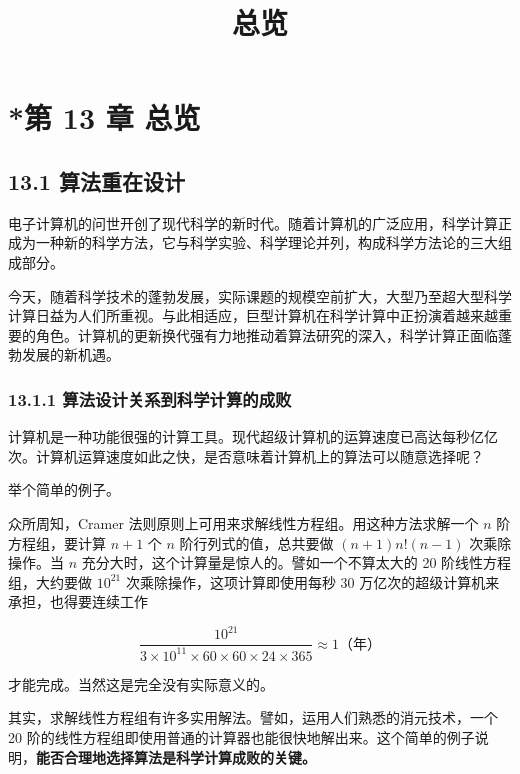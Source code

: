 \documentclass[
  10pt,
  fontset=fandol]{ctexart}
\title{总览}
\author{}
\date{}
\begin{document}
\maketitle

\section{*第 13 章 总览}\label{ux7b2c-13-ux7ae0-ux603bux89c8}

\subsection{13.1 算法重在设计}\label{ux7b97ux6cd5ux91cdux5728ux8bbeux8ba1}

电子计算机的问世开创了现代科学的新时代。随着计算机的广泛应用，科学计算正成为一种新的科学方法，它与科学实验、科学理论并列，构成科学方法论的三大组成部分。

今天，随着科学技术的蓬勃发展，实际课题的规模空前扩大，大型乃至超大型科学计算日益为人们所重视。与此相适应，巨型计算机在科学计算中正扮演着越来越重要的角色。计算机的更新换代强有力地推动着算法研究的深入，科学计算正面临蓬勃发展的新机遇。

\subsubsection{13.1.1 算法设计关系到科学计算的成败}\label{ux7b97ux6cd5ux8bbeux8ba1ux5173ux7cfbux5230ux79d1ux5b66ux8ba1ux7b97ux7684ux6210ux8d25}

计算机是一种功能很强的计算工具。现代超级计算机的运算速度已高达每秒亿亿次。计算机运算速度如此之快，是否意味着计算机上的算法可以随意选择呢？

举个简单的例子。

众所周知，Cramer 法则原则上可用来求解线性方程组。用这种方法求解一个 \(n\) 阶方程组，要计算 \(n+1\) 个 \(n\) 阶行列式的值，总共要做 \((n+1)n!(n-1)\) 次乘除操作。当 \(n\) 充分大时，这个计算量是惊人的。譬如一个不算太大的 20 阶线性方程组，大约要做 \(10^{21}\) 次乘除操作，这项计算即使用每秒 30 万亿次的超级计算机来承担，也得要连续工作

\[
\frac{10^{21}}{3\times10^{11}\times60\times60\times24\times365}\approx1\text{（年）}
\]

才能完成。当然这是完全没有实际意义的。

其实，求解线性方程组有许多实用解法。譬如，运用人们熟悉的消元技术，一个 20 阶的线性方程组即使用普通的计算器也能很快地解出来。这个简单的例子说明，\textbf{能否合理地选择算法是科学计算成败的关键。}
\end{document}
